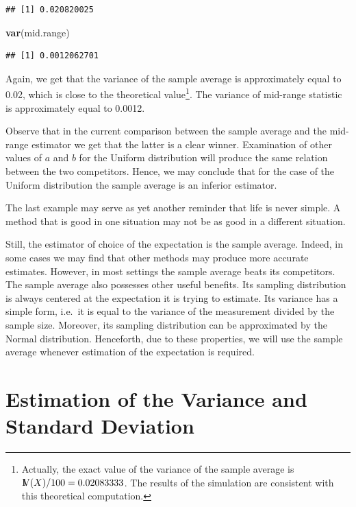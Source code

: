 \documentclass[]{krantz}
\makeatletter
\newenvironment{Shaded}{\begin{snugshade}}{\end{snugshade}}
\newcommand{\KeywordTok}[1]{\textcolor[rgb]{0.13,0.29,0.53}{\textbf{#1}}}
\newcommand{\NormalTok}[1]{#1}
\newcommand{\Var}{{\rm I\kern-.3em V}}
\newenvironment{kframe}{%
\medskip{}
\setlength{\fboxsep}{.8em}
 \def\at@end@of@kframe{}%
 \ifinner\ifhmode%
  \def\at@end@of@kframe{\end{minipage}}%
  \begin{minipage}{\columnwidth}%
 \fi\fi%
 \def\FrameCommand##1{\hskip\@totalleftmargin \hskip-\fboxsep
 \colorbox{shadecolor}{##1}\hskip-\fboxsep
     \hskip-\linewidth \hskip-\@totalleftmargin \hskip\columnwidth}%
 \MakeFramed {\advance\hsize-\width
   \@totalleftmargin\z@ \linewidth\hsize
   \@setminipage}}%
 {\par\unskip\endMakeFramed%
 \at@end@of@kframe}
\renewenvironment{Shaded}{\begin{kframe}}{\end{kframe}}
\theoremstyle{definition}
\theoremstyle{definition}
\theoremstyle{definition}
\theoremstyle{remark}
\makeatother
\begin{document}
\begin{verbatim}
## [1] 0.020820025
\end{verbatim}

\begin{Shaded}
\begin{Highlighting}[]
\KeywordTok{var}\NormalTok{(mid.range)}
\end{Highlighting}
\end{Shaded}

\begin{verbatim}
## [1] 0.0012062701
\end{verbatim}

Again, we get that the variance of the sample average is approximately
equal to 0.02, which is close to the theoretical value\footnote{Actually,
  the exact value of the variance of the sample average is
  \(\Var(X)/100 = 0.02083333\). The results of the simulation are
  consistent with this theoretical computation.}. The variance of
mid-range statistic is approximately equal to 0.0012.

Observe that in the current comparison between the sample average and
the mid-range estimator we get that the latter is a clear winner.
Examination of other values of \(a\) and \(b\) for the Uniform
distribution will produce the same relation between the two competitors.
Hence, we may conclude that for the case of the Uniform distribution the
sample average is an inferior estimator.

The last example may serve as yet another reminder that life is never
simple. A method that is good in one situation may not be as good in a
different situation.

Still, the estimator of choice of the expectation is the sample average.
Indeed, in some cases we may find that other methods may produce more
accurate estimates. However, in most settings the sample average beats
its competitors. The sample average also possesses other useful
benefits. Its sampling distribution is always centered at the
expectation it is trying to estimate. Its variance has a simple form,
i.e.~it is equal to the variance of the measurement divided by the
sample size. Moreover, its sampling distribution can be approximated by
the Normal distribution. Henceforth, due to these properties, we will
use the sample average whenever estimation of the expectation is
required.

\section{Estimation of the Variance and Standard
Deviation}\label{estimation-of-the-variance-and-standard-deviation}
\end{document}
